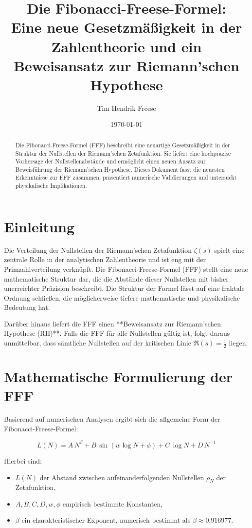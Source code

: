\documentclass[a4paper,12pt]{article}
\title{\textbf{Die Fibonacci-Freese-Formel:}\\
Eine neue Gesetzmäßigkeit in der Zahlentheorie und ein Beweisansatz zur Riemann’schen Hypothese}
\author{Tim Hendrik Freese}
\date{\today}
\newcommand{\zetaR}{\zeta(s)}
\begin{document}
\maketitle

\begin{abstract}
Die Fibonacci-Freese-Formel (FFF) beschreibt eine neuartige Gesetzmäßigkeit in der Struktur der Nullstellen der Riemann’schen Zetafunktion. Sie liefert eine hochpräzise Vorhersage der Nullstellenabstände und ermöglicht einen neuen Ansatz zur Beweisführung der Riemann’schen Hypothese. Dieses Dokument fasst die neuesten Erkenntnisse zur FFF zusammen, präsentiert numerische Validierungen und untersucht physikalische Implikationen. 
\end{abstract}

\tableofcontents
\newpage

\section{Einleitung}
Die Verteilung der Nullstellen der Riemann’schen Zetafunktion $\zetaR$ spielt eine zentrale Rolle in der analytischen Zahlentheorie und ist eng mit der Primzahlverteilung verknüpft. Die Fibonacci-Freese-Formel (FFF) stellt eine neue mathematische Struktur dar, die die Abstände dieser Nullstellen mit bisher unerreichter Präzision beschreibt. Die Struktur der Formel lässt auf eine fraktale Ordnung schließen, die möglicherweise tiefere mathematische und physikalische Bedeutung hat.

Darüber hinaus liefert die FFF einen **Beweisansatz zur Riemann’schen Hypothese (RH)**. Falls die FFF für alle Nullstellen gültig ist, folgt daraus unmittelbar, dass sämtliche Nullstellen auf der kritischen Linie $\Re(s) = \frac{1}{2}$ liegen. 

\section{Mathematische Formulierung der FFF}
Basierend auf numerischen Analysen ergibt sich die allgemeine Form der Fibonacci-Freese-Formel:

\begin{equation}
    L(N) = A\,N^{\beta} + B\,\sin(w \log N + \phi) + C\,\log N + D\,N^{-1}
\end{equation}

Hierbei sind:
\begin{itemize}
    \item $L(N)$ der Abstand zwischen aufeinanderfolgenden Nullstellen $\rho_N$ der Zetafunktion,
    \item $A, B, C, D, w, \phi$ empirisch bestimmte Konstanten,
    \item $\beta$ ein charakteristischer Exponent, numerisch bestimmt als $\beta \approx 0.916977$.
\end{itemize}
\end{document}
